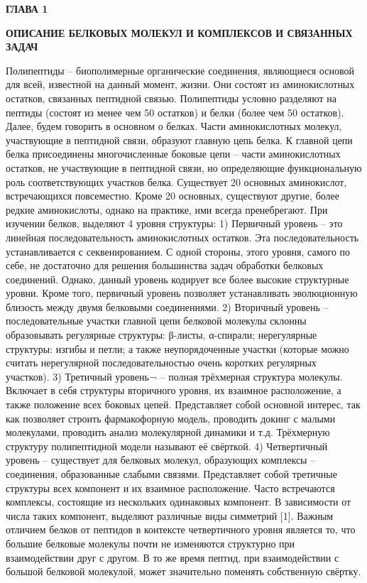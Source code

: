 \newpage
\begin{center}
	\textbf{\large ГЛАВА 1}

	\textbf{\large ОПИСАНИЕ БЕЛКОВЫХ МОЛЕКУЛ И КОМПЛЕКСОВ И СВЯЗАННЫХ ЗАДАЧ}
\end{center}


Полипептиды – биополимерные органические соединения, являющиеся основой для всей, известной на данный момент, жизни. Они состоят из аминокислотных остатков, связанных пептидной связью. Полипептиды условно разделяют на пептиды (состоят из менее чем 50 остатков) и белки (более чем 50 остатков). Далее, будем говорить в основном о белках. Части аминокислотных молекул, участвующие в пептидной связи, образуют главную цепь белка. К главной цепи белка присоединены многочисленные боковые цепи – части аминокислотных остатков, не участвующие в пептидной связи, но определяющие функциональную роль соответствующих участков белка. Существует 20 основных аминокислот, встречающихся повсеместно. Кроме 20 основных, существуют другие, более редкие аминокислоты, однако на практике, ими всегда пренебрегают. При изучении белков, выделяют 4 уровня структуры:
1)	Первичный уровень – это линейная последовательность аминокислотных остатков. Эта последовательность устанавливается с секвенированием. С одной стороны, этого уровня, самого по себе, не достаточно для решения большинства задач обработки белковых соединений. Однако, данный уровень кодирует все более высокие структурные уровни. Кроме того, первичный уровень позволяет устанавливать эволюционную близость между двумя белковыми соединениями.
2)	Вторичный уровень – последовательные участки главной цепи белковой молекулы склонны образовывать регулярные структуры: β-листы, α-спирали; нерегулярные структуры: изгибы и петли; а также неупорядоченные участки (которые можно считать нерегулярной последовательностью очень коротких регулярных участков).
3)	Третичный уровень¬ – полная трёхмерная структура молекулы. Включает в себя структуры вторичного уровня, их взаимное расположение, а также положение всех боковых цепей. Представляет собой основной интерес, так как позволяет строить фармакофорную модель, проводить докинг с малыми молекулами, проводить анализ молекулярной динамики и т.д. Трёхмерную структуру полипептидной модели называют её свёрткой. 
4)	Четвертичный уровень – существует для белковых молекул, образующих комплексы – соединения, образованные слабыми связями. Представляет собой третичные структуры всех компонент и их взаимное расположение. Часто встречаются комплексы, состоящие из нескольких одинаковых компонент. В зависимости от числа таких компонент, выделяют различные виды симметрий [1]. Важным отличием белков от пептидов в контексте четвертичного уровня является то, что большие белковые молекулы почти не изменяются структурно при взаимодействии друг с другом. В то же время пептид, при взаимодействии с большой белковой молекулой, может значительно поменять собственную свёртку.
